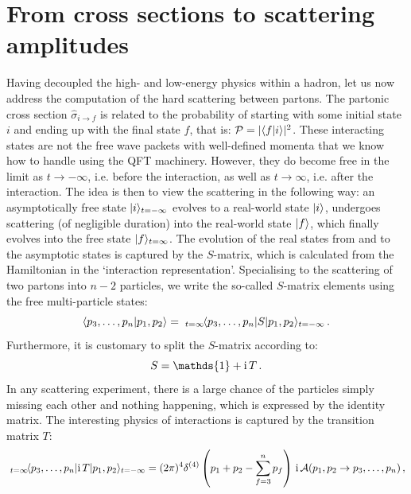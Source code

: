 \documentclass[main.tex]{subfiles}
\begin{document}
\section{From cross sections to scattering amplitudes} \label{sec:fromcrosssectoamps}
Having decoupled the high- and low-energy physics within a hadron, let us now address the computation of the hard scattering between partons. The partonic cross section $\hat{\sigma}_{i\rightarrow f}$ is related to the probability of starting with some initial state $i$ and ending up with the final state $f$, that is: $\mathcal{P} = |\langle f|i \rangle|^2$. These interacting states are not the free wave packets with well-defined momenta that we know how to handle using the QFT machinery. However, they do become free in the limit as $t\rightarrow -\infty$, i.e. before the interaction, as well as $t \rightarrow \infty$, i.e. after the interaction. The idea is then to view the scattering in the following way: an asymptotically free state $|i \rangle_{t=-\infty}$ evolves to a real-world state $|i \rangle$, undergoes scattering (of negligible duration) into the real-world state $|f \rangle$, which finally evolves into the free state $|f \rangle_{t=\infty}$. The evolution of the real states from and to the asymptotic states is captured by the $S$-matrix, which is calculated from the Hamiltonian in the `interaction representation'. Specialising to the scattering of two partons into $n-2$ particles, we write the so-called $S$-matrix elements using the free multi-particle states:
\begin{equation} \label{eq:Smatrixelements}
    \braket{p_3, \ldots, p_n | p_1,p_2} = \; _{t=\infty} \hspace{-0.05cm} \braket{p_3, \ldots, p_n|S|p_1,p_2}_{t=-\infty}\,.
\end{equation}
Furthermore, it is customary to split the $S$-matrix according to:
\begin{equation} \label{eq:StoiT}
    S = \mathds{1} + \i T\,.
\end{equation}
In any scattering experiment, there is a large chance of the particles simply missing each other and nothing happening, which is expressed by the identity matrix. The interesting physics of interactions is captured by the transition matrix $T$:
\begin{equation} \label{eq:Tmatamplitudes}
    \; _{t=\infty} \hspace{-0.05cm} \braket{p_3, \ldots, p_n|\i T|p_1,p_2}_{t=-\infty} = (2\pi)^4 \delta^{(4)}\left(p_1+p_2 - \sum_{f=3}^n p_f\right)\, \i \mathcal{A} (p_1,p_2 \rightarrow p_3, \ldots, p_n) \,,
\end{equation}
\end{document}
